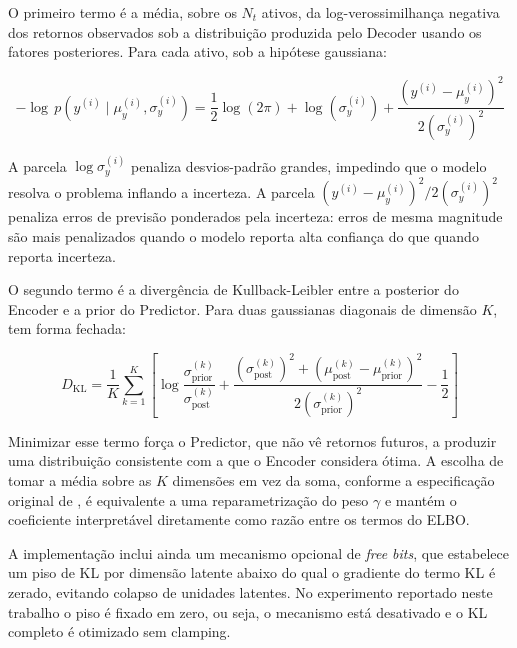 O primeiro termo é a média, sobre os $N_t$ ativos, da log-verossimilhança negativa dos
retornos observados sob a distribuição produzida pelo Decoder usando os fatores
posteriores. Para cada ativo, sob a hipótese gaussiana:

\begin{equation}
    -\log \, p\!\left(y^{(i)} \mid \mu_y^{(i)}, \sigma_y^{(i)}\right) =
    \frac{1}{2}\log(2\pi) + \log\!\left(\sigma_y^{(i)}\right) +
    \frac{\left(y^{(i)} - \mu_y^{(i)}\right)^2}{2\left(\sigma_y^{(i)}\right)^2}
    \label{eq:nll-per-stock}
\end{equation}

A parcela $\log \sigma_y^{(i)}$ penaliza desvios-padrão grandes, impedindo que o
modelo resolva o problema inflando a incerteza. A parcela $(y^{(i)} -
\mu_y^{(i)})^2 / 2(\sigma_y^{(i)})^2$ penaliza erros de previsão ponderados pela
incerteza: erros de mesma magnitude são mais penalizados quando o modelo reporta alta
confiança do que quando reporta incerteza.

O segundo termo é a divergência de Kullback-Leibler entre a posterior do Encoder e a
prior do Predictor. Para duas gaussianas diagonais de dimensão $K$, tem forma fechada:

\begin{equation}
    D_{\text{KL}} = \frac{1}{K}\sum_{k=1}^{K}\left[\log\frac{\sigma_{\text{prior}}^{(k)}}
    {\sigma_{\text{post}}^{(k)}} + \frac{(\sigma_{\text{post}}^{(k)})^2 +
    (\mu_{\text{post}}^{(k)} - \mu_{\text{prior}}^{(k)})^2}
    {2(\sigma_{\text{prior}}^{(k)})^2} - \frac{1}{2}\right]
    \label{eq:kl}
\end{equation}

Minimizar esse termo força o Predictor, que não vê retornos futuros, a produzir uma
distribuição consistente com a que o Encoder considera ótima. A escolha de tomar a
média sobre as $K$ dimensões em vez da soma, conforme a especificação original de
\textcite{duan2022}, é equivalente a uma reparametrização do peso $\gamma$ e mantém o
coeficiente interpretável diretamente como razão entre os termos do ELBO.

A implementação inclui ainda um mecanismo opcional de \textit{free bits}, que
estabelece um piso de KL por dimensão latente abaixo do qual o gradiente do termo KL é
zerado, evitando colapso de unidades latentes. No experimento reportado neste trabalho
o piso é fixado em zero, ou seja, o mecanismo está desativado e o KL completo é
otimizado sem clamping.

